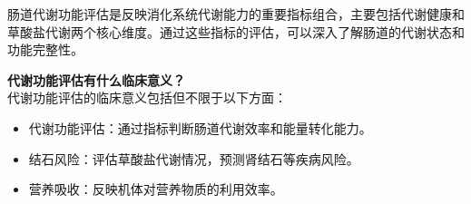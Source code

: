 \documentclass[UTF8]{ctexart}
\begin{document}
\vspace{0.05cm}

\begin{tcolorbox}[
enhanced,
colback=customTealBg,
colframe=gray!3,
arc=3mm,
boxrule=0pt,
width=\textwidth,
top=8pt,
bottom=8pt
]
{\small{\color{customTeal}\faInfoCircle} 肠道代谢功能评估是反映消化系统代谢能力的重要指标组合，主要包括代谢健康和草酸盐代谢两个核心维度。通过这些指标的评估，可以深入了解肠道的代谢状态和功能完整性。
}
\end{tcolorbox}
\begin{tcolorbox}[
    enhanced,
    colback=lightpurple!10, %
    colframe=white,  %
    arc=3mm,
    boxrule=0.5pt,
    width=\textwidth,
    top=8pt,
    bottom=8pt
]
{\small{\color{lightpurple}\faQuestionCircle}\quad \textbf{代谢功能评估有什么临床意义？}\\
{\color{orange!50}\faComments}\quad 代谢功能评估的临床意义包括但不限于以下方面：
\begin{itemize}
    \item 代谢功能评估：通过指标判断肠道代谢效率和能量转化能力。
    \item 结石风险：评估草酸盐代谢情况，预测肾结石等疾病风险。
    \item 营养吸收：反映机体对营养物质的利用效率。
\end{itemize}
}
\end{tcolorbox}
\vspace{-0.5cm}
\end{document}
